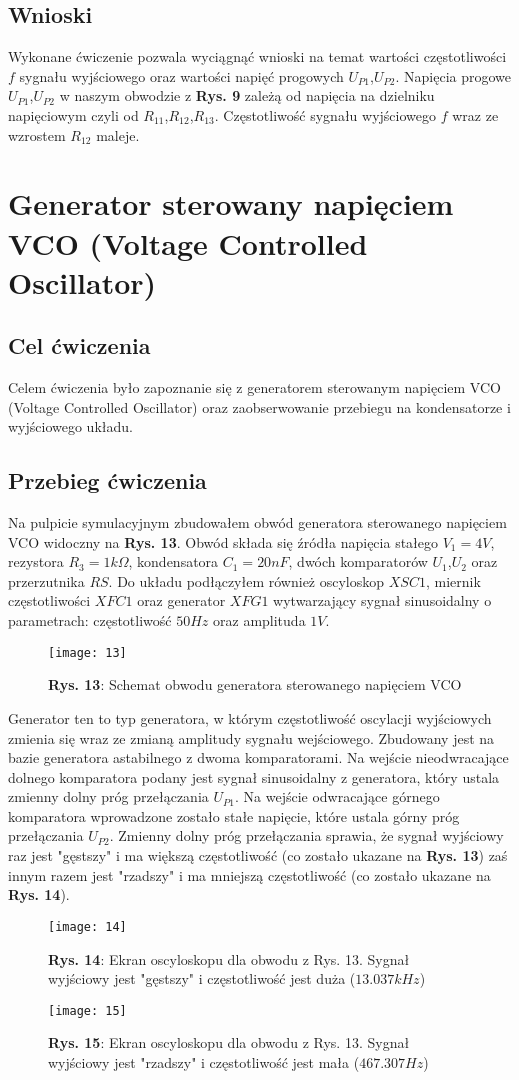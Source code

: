 \documentclass[12pt]{article}
\begin{document}
\subsection{Wnioski}
Wykonane ćwiczenie pozwala wyciągnąć wnioski na temat wartości częstotliwości $f$ sygnału wyjściowego oraz wartości napięć progowych $U_{P1}$,$U_{P2}$. Napięcia progowe $U_{P1}$,$U_{P2}$ w naszym obwodzie z \textbf{Rys. 9} zależą od napięcia na dzielniku napięciowym czyli od $R_{11}$,$R_{12}$,$R_{13}$. Częstotliwość sygnału wyjściowego $f$ wraz ze wzrostem $R_{12}$ maleje.
\section{Generator sterowany napięciem VCO (Voltage Controlled Oscillator)}
\subsection{Cel ćwiczenia}
Celem ćwiczenia było zapoznanie się z generatorem sterowanym napięciem VCO (Voltage Controlled Oscillator) oraz zaobserwowanie przebiegu na kondensatorze i wyjściowego układu.
\subsection{Przebieg ćwiczenia}
Na pulpicie symulacyjnym zbudowałem obwód generatora sterowanego napięciem VCO widoczny na \textbf{Rys. 13}. Obwód składa się źródła napięcia stałego $V_1=4V$, rezystora $R_3=1k\Omega$, kondensatora $C_1=20nF$, dwóch komparatorów $U_1$,$U_2$ oraz przerzutnika $RS$. Do układu podłączyłem również oscyloskop $XSC1$, miernik częstotliwości $XFC1$ oraz generator $XFG1$ wytwarzający sygnał sinusoidalny o parametrach: częstotliwość $50Hz$ oraz amplituda $1V$.
\begin{figure}[H]
\centering
\texttt{[image: 13]}
\caption*{\textbf{Rys. 13}: Schemat obwodu generatora sterowanego napięciem VCO }
\end{figure}
\noindent Generator ten to typ generatora, w którym częstotliwość oscylacji wyjściowych zmienia się wraz ze zmianą amplitudy sygnału wejściowego. Zbudowany jest na bazie generatora astabilnego z dwoma komparatorami. Na wejście nieodwracające dolnego komparatora podany jest sygnał sinusoidalny z generatora, który ustala zmienny dolny próg przełączania $U_{P1}$. Na wejście odwracające górnego komparatora wprowadzone zostało stałe napięcie, które ustala górny próg przełączania $U_{P2}$. Zmienny dolny próg przełączania sprawia, że sygnał wyjściowy raz jest "gęstszy" i ma większą częstotliwość (co zostało ukazane na \textbf{Rys. 13}) zaś innym razem jest "rzadszy" i ma mniejszą częstotliwość (co zostało ukazane na \textbf{Rys. 14}).
\begin{figure}[H]
\centering
\texttt{[image: 14]}
\caption*{\textbf{Rys. 14}: Ekran oscyloskopu dla obwodu z Rys. 13. Sygnał wyjściowy jest "gęstszy" i częstotliwość jest duża ($13.037kHz$) }
\end{figure}
\begin{figure}[H]
\centering
\texttt{[image: 15]}
\caption*{\textbf{Rys. 15}: Ekran oscyloskopu dla obwodu z Rys. 13. Sygnał wyjściowy jest "rzadszy" i częstotliwość jest mała ($467.307Hz$) }
\end{figure}
\end{document}

